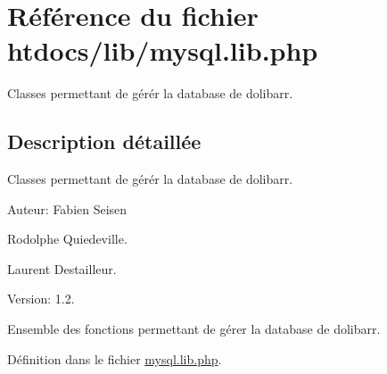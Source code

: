\hypertarget{mysql_8lib_8php}{
\section{R\'{e}f\'{e}rence du fichier htdocs/lib/mysql.lib.php}
\label{mysql_8lib_8php}
}
Classes permettant de g\'{e}r\'{e}r la database de dolibarr.  




\subsection{Description d\'{e}taill\'{e}e}
Classes permettant de g\'{e}r\'{e}r la database de dolibarr. 

\begin{Desc}
\item[Auteur:]Fabien Seisen 

Rodolphe Quiedeville. 

Laurent Destailleur. \end{Desc}
\begin{Desc}
\item[Version:]1.2.\end{Desc}
Ensemble des fonctions permettant de g\'{e}rer la database de dolibarr.

D\'{e}finition dans le fichier \hyperlink{mysql_8lib_8php-source}{mysql.lib.php}.